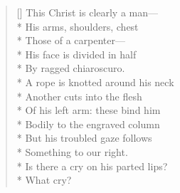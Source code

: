\begin{verse}[\versewidth]
This Christ is clearly a man---\\*
His arms, shoulders, chest\\*
Those of a carpenter---\\*
His face is divided in half\\*
By ragged chiaroscuro.\\*
A rope is knotted around his neck\\*
Another cuts into the flesh\\*
Of his left arm: these bind him\\*
Bodily to the engraved column\\*
But his troubled gaze follows\\*
Something to our right.\\*
Is there a cry on his parted lips?\\*
What cry?
\end{verse}
